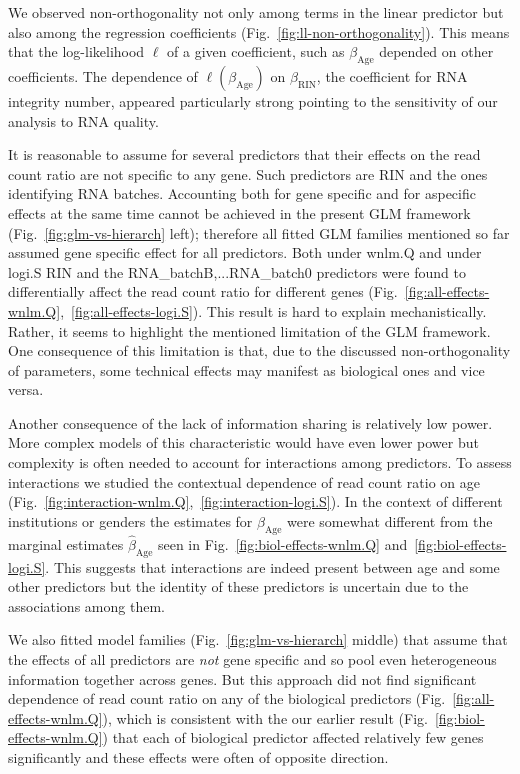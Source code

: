\documentclass[letterpaper]{article}
\begin{document}
We observed non-orthogonality not only among terms in the linear predictor but
also among the regression coefficients (Fig.~\ref{fig:ll-non-orthogonality}).
This means that the log-likelihood \(\ell\) of a given coefficient, such as
\(\beta_\mathrm{Age}\) depended on other coefficients.  The dependence of
\(\ell(\beta_\mathrm{Age})\) on \(\beta_\mathrm{RIN}\), the coefficient for
RNA integrity number, appeared particularly strong pointing to the sensitivity
of our analysis to RNA quality.

It is reasonable to assume for several predictors that their effects on the
read count ratio are not specific to any gene.  Such predictors are RIN
and the ones identifying RNA batches.  Accounting both for gene specific and
for aspecific effects at the same time cannot be achieved in the present GLM
framework (Fig.~\ref{fig:glm-vs-hierarch} left); therefore all fitted GLM
families mentioned so far assumed gene specific effect for all predictors.
Both under wnlm.Q and under logi.S RIN and the RNA\_batchB,...RNA\_batch0
predictors were found to differentially affect the read count ratio for
different genes
(Fig.~\ref{fig:all-effects-wnlm.Q},~\ref{fig:all-effects-logi.S}).  This result
is hard to explain mechanistically.  Rather, it seems to highlight the
mentioned limitation of the GLM framework.  One consequence of this limitation
is that, due to the discussed non-orthogonality of parameters, some technical
effects may manifest as biological ones and vice versa.

Another consequence of the lack of information sharing is relatively low
power.  More complex models of this characteristic would have even lower power
but complexity is often needed to account for interactions among predictors.
To assess interactions we studied the contextual dependence of read count
ratio on age
(Fig.~\ref{fig:interaction-wnlm.Q},~\ref{fig:interaction-logi.S}).  In the
context of different institutions or genders the estimates for
\(\beta_\mathrm{Age}\) were somewhat different from the marginal estimates
\(\hat\beta_\mathrm{Age}\) seen in Fig.~\ref{fig:biol-effects-wnlm.Q}
and~\ref{fig:biol-effects-logi.S}.  This suggests that interactions are
indeed present between age and some other predictors but the identity of these
predictors is uncertain due to the associations among them.

We also fitted model families (Fig.~\ref{fig:glm-vs-hierarch} middle) that
assume that the effects of all predictors are \emph{not} gene specific and so
pool even heterogeneous information together across genes.  But this approach
did not find significant dependence of read count ratio on any of the
biological predictors (Fig.~\ref{fig:all-effects-wnlm.Q}), which is consistent
with the our earlier result (Fig.~\ref{fig:biol-effects-wnlm.Q}) that each of
biological predictor affected relatively few genes significantly and these
effects were often of opposite direction.
\end{document}
